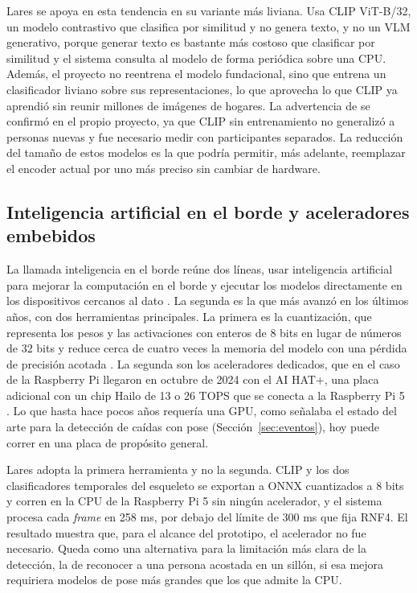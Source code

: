 Lares se apoya en esta tendencia en su variante más liviana.
Usa CLIP ViT-B/32, un modelo contrastivo que clasifica por similitud y no genera texto, y no un VLM generativo, porque generar texto es bastante más costoso que clasificar por similitud y el sistema consulta al modelo de forma periódica sobre una CPU.
Además, el proyecto no reentrena el modelo fundacional, sino que entrena un clasificador liviano sobre sus representaciones, lo que aprovecha lo que CLIP ya aprendió sin reunir millones de imágenes de hogares.
La advertencia de \textcite{Bommasani2021} se confirmó en el propio proyecto, ya que CLIP sin entrenamiento no generalizó a personas nuevas y fue necesario medir con participantes separados.
La reducción del tamaño de estos modelos es la que podría permitir, más adelante, reemplazar el encoder actual por uno más preciso sin cambiar de hardware.

\subsection{Inteligencia artificial en el borde y aceleradores embebidos}

La llamada inteligencia en el borde reúne dos líneas, usar inteligencia artificial para mejorar la computación en el borde y ejecutar los modelos directamente en los dispositivos cercanos al dato \parencite{Deng2020}.
La segunda es la que más avanzó en los últimos años, con dos herramientas principales.
La primera es la cuantización, que representa los pesos y las activaciones con enteros de 8 bits en lugar de números de 32 bits y reduce cerca de cuatro veces la memoria del modelo con una pérdida de precisión acotada \parencite{Jacob2018}.
La segunda son los aceleradores dedicados, que en el caso de la Raspberry Pi llegaron en octubre de 2024 con el AI HAT+, una placa adicional con un chip Hailo de 13 o 26 TOPS que se conecta a la Raspberry Pi 5 \parencite{RaspberryPi2024}.
Lo que hasta hace pocos años requería una GPU, como señalaba el estado del arte para la detección de caídas con pose (Sección~\ref{sec:eventos}), hoy puede correr en una placa de propósito general.

Lares adopta la primera herramienta y no la segunda.
CLIP y los dos clasificadores temporales del esqueleto se exportan a ONNX cuantizados a 8 bits y corren en la CPU de la Raspberry Pi 5 sin ningún acelerador, y el sistema procesa cada \textit{frame} en 258 ms, por debajo del límite de 300 ms que fija RNF4.
El resultado muestra que, para el alcance del prototipo, el acelerador no fue necesario.
Queda como una alternativa para la limitación más clara de la detección, la de reconocer a una persona acostada en un sillón, si esa mejora requiriera modelos de pose más grandes que los que admite la CPU.

